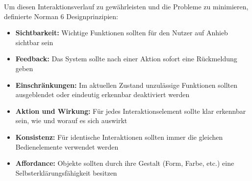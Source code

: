 Um diesen Interaktionsverlauf zu gewährleisten und die Probleme zu minimieren, definierte Norman 6 Designprinzipien:
\begin{itemize}
	\item \textbf{Sichtbarkeit:} Wichtige Funktionen sollten für den Nutzer auf Anhieb sichtbar sein
	\item \textbf{Feedback:} Das System sollte nach einer Aktion sofort eine Rückmeldung geben
	\item \textbf{Einschränkungen:} Im aktuellen Zustand unzulässige Funktionen sollten ausgeblendet oder eindeutig erkennbar deaktiviert werden
	\item \textbf{Aktion und Wirkung:} Für jedes Interaktionselement sollte klar erkennbar sein, wie und worauf es sich auswirkt
	\item \textbf{Konsistenz:} Für identische Interaktionen sollten immer die gleichen Bedienelemente verwendet werden
	\item \textbf{Affordance:} Objekte sollten durch ihre Gestalt (Form, Farbe, etc.) eine Selbsterklärungsfähigkeit besitzen \cite{Ullenboom2014}
\end{itemize}
